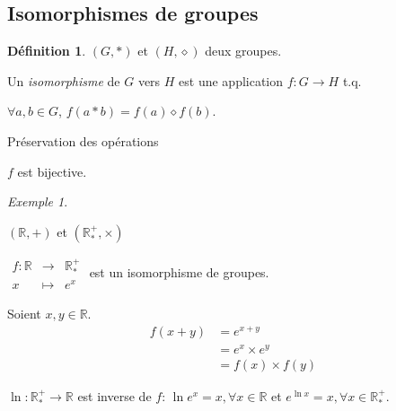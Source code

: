 \documentclass{report}
\newcommand*{\reels}{\mathbb{R}}
\theoremstyle{definition}
\newtheorem*{defin}{D\'efinition}
\theoremstyle{remark}
\newtheorem*{exem}{Exemple}
\begin{document}
	\subsection{Isomorphismes de groupes}
	\begin{defin}
		$(G,*)$ et $(H,\diamond)$ deux groupes.

		Un \emph{isomorphisme} de $G$ vers $H$ est une application $f:G \to H$ t.q.
		\begin{nlist}[noitemsep]
			\item $\forall a,b \in G$, $f(a*b)=f(a)\diamond f(b)$.

			Pr\'eservation des op\'erations
			\item $f$ est bijective.
		\end{nlist}
	\end{defin}
	\begin{exem}~

		\begin{ulist}
			\item $(\reels,+)$ et $(\reels^+_*,\times)$

			$\begin{array}{rcl}
				f:\reels&\to&\reels^+_*\\
				x&\mapsto&e^x
			\end{array}$ est un isomorphisme de groupes.
			\begin{nlist}
				\item Soient $x,y \in \reels$.
				\begin{align*}
					f(x+y)&= e^{x+y}\\
					&= e^x \times e^y\\
					&= f(x) \times f(y)
				\end{align*}
				\item $\ln:\reels^+_* \to \reels$ est inverse de $f$: $\ln e^x=x, \forall x \in \reels$ et $e^{\ln x}=x, \forall x \in \reels^+_*$.
			\end{nlist}
		\end{ulist}
	\end{exem}
\end{document}
